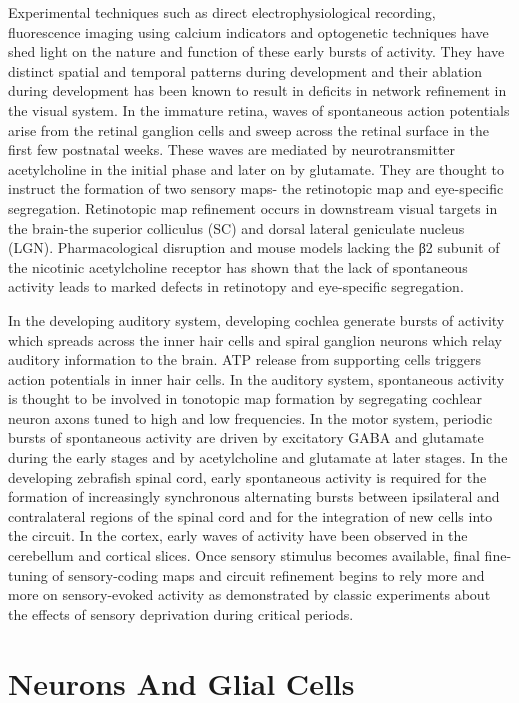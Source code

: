 \documentclass[]{book}
\begin{document}
Experimental techniques such as direct electrophysiological recording, fluorescence imaging using calcium indicators and optogenetic techniques have shed light on the nature and function of these early bursts of activity. They have distinct spatial and temporal patterns during development and their ablation during development has been known to result in deficits in network refinement in the visual system. In the immature retina, waves of spontaneous action potentials arise from the retinal ganglion cells and sweep across the retinal surface in the first few postnatal weeks. These waves are mediated by neurotransmitter acetylcholine in the initial phase and later on by glutamate. They are thought to instruct the formation of two sensory maps- the retinotopic map and eye-specific segregation. Retinotopic map refinement occurs in downstream visual targets in the brain-the superior colliculus (SC) and dorsal lateral geniculate nucleus (LGN). Pharmacological disruption and mouse models lacking the β2 subunit of the nicotinic acetylcholine receptor has shown that the lack of spontaneous activity leads to marked defects in retinotopy and eye-specific segregation.

In the developing auditory system, developing cochlea generate bursts of activity which spreads across the inner hair cells and spiral ganglion neurons which relay auditory information to the brain. ATP release from supporting cells triggers action potentials in inner hair cells. In the auditory system, spontaneous activity is thought to be involved in tonotopic map formation by segregating cochlear neuron axons tuned to high and low frequencies. In the motor system, periodic bursts of spontaneous activity are driven by excitatory GABA and glutamate during the early stages and by acetylcholine and glutamate at later stages. In the developing zebrafish spinal cord, early spontaneous activity is required for the formation of increasingly synchronous alternating bursts between ipsilateral and contralateral regions of the spinal cord and for the integration of new cells into the circuit. In the cortex, early waves of activity have been observed in the cerebellum and cortical slices. Once sensory stimulus becomes available, final fine-tuning of sensory-coding maps and circuit refinement begins to rely more and more on sensory-evoked activity as demonstrated by classic experiments about the effects of sensory deprivation during critical periods.

\hypertarget{neurons-and-glial-cells}{%
\chapter{Neurons And Glial Cells}\label{neurons-and-glial-cells}}
\end{document}
